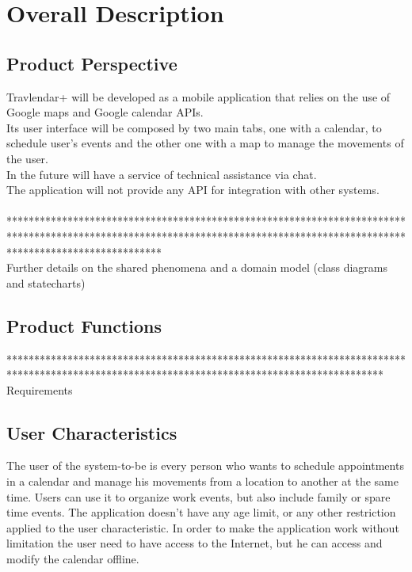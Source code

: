 %
%
\chapter{Overall Description}
%
\label{cap:overalldescription}
%
%
\section{Product Perspective}
Travlendar+ will be developed as a mobile application that relies on the use of Google maps and Google calendar APIs. \\
Its user interface will be composed by two main tabs, one with a calendar, to schedule user's events and the other one with a map to manage the movements of the user. \\
In the future will have a service of technical assistance via chat. \\
The application will not provide any API for integration with other systems.
\\
\\
**************************************************************************************************************************************************************************** \\
Further details on the shared phenomena and a domain model (class diagrams and statecharts)
%
%
\section{Product Functions}
******************************************************************************************************************************************** \\
Requirements
%
%
\section{User Characteristics}
The user of the system-to-be is every person who wants to schedule appointments in a calendar and manage his movements from a location to another at the same time.
Users can use it to organize work events, but also include family or spare time events. The application doesn't have any age limit, or any other restriction applied to the user characteristic. In order to make the application work without limitation the user need to have access to the Internet, but he can access and modify the calendar offline.
%
%
